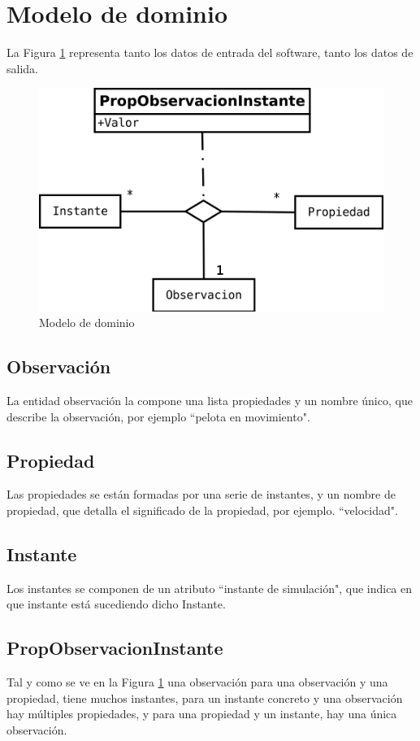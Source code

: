 \section{Modelo de dominio}
La Figura \ref{fig:ModelodeDominio} representa tanto los datos de entrada del software, tanto los datos
de salida.

\begin{figure}[H]
\centering
\includegraphics[width=0.7\linewidth]{./Figures/ModelodeDominio}
\caption[Modelo de dominio]{Modelo de dominio}
\label{fig:ModelodeDominio}
\end{figure}

\subsection{Observaci\'on}
La entidad observaci\'on la compone una lista propiedades y un nombre \'unico, que describe la observaci\'on,
por ejemplo ``pelota en movimiento".

\subsection{Propiedad}
Las propiedades se est\'an formadas por una serie de instantes, y un nombre de propiedad, que detalla el
significado de la propiedad, por ejemplo. ``velocidad".

\subsection{Instante}
Los instantes se componen de un atributo ``instante de simulaci\'on", que indica en que instante est\'a sucediendo
dicho Instante.

\subsection{PropObservacionInstante}
Tal y como se ve en la Figura \ref{fig:ModelodeDominio} una observaci\'on para una observaci\'on y una propiedad,
tiene muchos instantes, para un instante concreto y una observaci\'on hay m\'ultiples propiedades, y para
una propiedad y un instante, hay una \'unica observaci\'on.

